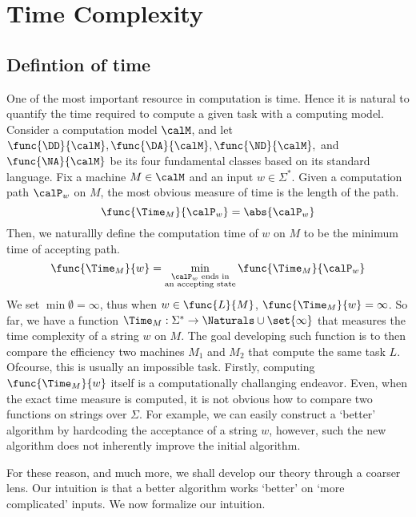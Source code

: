 \chapter{Time Complexity}
\section{Defintion of time}
One of the most important resource in computation is time. Hence it is natural to quantify the time required to compute a given task with a computing model. Consider a computation model \(\calM\), and let \(\func{\DD}{\calM}, \func{\DA}{\calM},\func{\ND}{\calM},\)  and \(\func{\NA}{\calM}\) be its four fundamental classes based on its standard language. Fix a machine \(M \in \calM\) and an input \(w \in \Sigma^{\ast}\). Given a computation path \(\calP_w\) on \(M\),  the most obvious measure of time is the length of the path.
\begin{equation*}
    \func{\Time_M}{\calP_w} = \abs{\calP_w}
\end{equation*} 
Then, we naturallly define the computation time of \(w\) on \(M\) to be the minimum time of accepting path.
\begin{equation*}
    \func{\Time_M}{w} = \min_{\substack{\calP_w \text{ ends in}\\\text{an accepting state}}}\func{\Time_M}{\calP_w} 
\end{equation*}
We set \(\min \emptyset = \infty\), thus when \(w \in \func{L}{M}\), \(\func{\Time_M}{w} = \infty\). So far, we have a function \(\Time_M : \Sigma^{\ast} \to \Naturals \cup \set{\infty}\) that measures the time complexity of a string \(w\) on \(M\). The goal developing such function is to then compare the efficiency two machines \(M_1\) and \(M_2\) that compute the same task \(L\). Ofcourse, this is usually an impossible task. Firstly, computing \(\func{\Time_M}{w}\) itself is a computationally challanging endeavor. Even, when the exact time measure is computed, it is not obvious how to compare two functions on strings over \(\Sigma\). For example, we can easily construct a `better' algorithm by hardcoding the acceptance of a string \(w\), however, such the new algorithm does not inherently improve the initial algorithm. 

For these reason, and much more, we shall develop our theory through a coarser lens. Our intuition is that a better algorithm works `better' on `more complicated' inputs. We now formalize our intuition.

